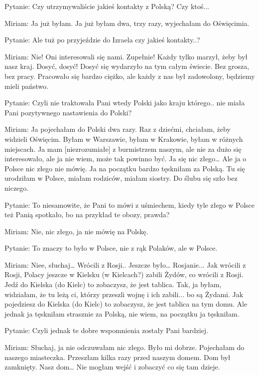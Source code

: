  

Pytanie: Czy utrzymywaliście jakieś kontakty z Polską? Czy ktoś... 

Miriam: Ja już byłam. Ja już byłam dwa, trzy razy, wyjechałam do Oświęcimia. 

Pytanie: Ale tuż po przyjeździe do Izraela czy jakieś kontakty..? 

Miriam: Nie! Oni interesowali się nami. Zupełnie! Każdy tylko marzył, żeby był nasz kraj. Dosyć, dosyć! Dosyć się wydarzyło na tym całym świecie. Bez grosza, bez pracy. Pracowało się bardzo ciężko, ale każdy z nas był zadowolony, będziemy mieli państwo. 

Pytanie: Czyli nie traktowała Pani wtedy Polski jako kraju którego.. nie miała Pani pozytywnego nastawienia do Polski? 

Miriam: Ja pojechałam do Polski dwa razy. Raz z dziećmi, chciałam, żeby widzieli Oświęcim. Byłam w Warszawie, byłam w Krakowie, byłam w różnych miejscach. Ja mam [niezrozumiałe] z burmistrzem naszym, ale nie za dużo się interesowało, ale ja nie wiem, może tak powinno być. Ja się nic złego… Ale ja o Polsce nic złego nie mówię. Ja na początku bardzo tęskniłam za Polską. Tu się urodziłam w Polsce, miałam rodziców, miałam siostry. Do ślubu się szło bez niczego. 

 

Pytanie: To niesamowite, że Pani to mówi z uśmiechem, kiedy tyle złego w Polsce też Panią spotkało, bo na przykład te obozy, prawda? 

Miriam: Nie, nic złego, ja nie mówię na Polskę. 

Pytanie: To znaczy to było w Polsce, nie z rąk Polaków, ale w Polsce. 

Miriam: Niee, słuchaj… Wrócili z Rosji.. Jeszcze było… Rosjanie... Jak wrócili z Rosji, Polacy jeszcze  w Kielsku (w Kielcach?) zabili Żydów, co wrócili z Rosji. Jedź do Kielska (do Kielc) to zobaczysz, że jest tablica. Tak, ja byłam, widziałam, że tu leżą ci, którzy przeszli wojnę i ich zabili... bo są Żydami. Jak pojedziesz do Kielska (do Kielc) to zobaczysz, że jest tablica na tym domu. Ale jednak ja tęskniłam strasznie za Polską, nie wiem, na początku ja tęskniłam. 

 

Pytanie: Czyli jednak te dobre wspomnienia zostały Pani bardziej. 

Miriam: Słuchaj, ja nie odczuwałam nic złego. Było mi dobrze. Pojechałam do naszego miasteczka. Przeszłam kilka razy przed naszym domem. Dom był zamknięty. Nasz dom… Nie mogłam wejść i zobaczyć co się tam dzieje. 


